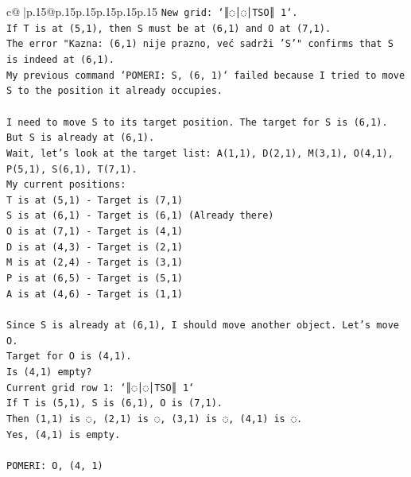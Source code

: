 \documentclass{article}
\begin{document}
{\begin{supertabular}{c@{$\;$}|p{.15\linewidth}@{}p{.15\linewidth}p{.15\linewidth}p{.15\linewidth}p{.15\linewidth}p{.15\linewidth}}
{{{\texttt{New grid: `║◌│◌│TSO║ 1`.} \\
\texttt{If T is at (5,1), then S must be at (6,1) and O at (7,1).} \\
\texttt{The error "Kazna: (6,1) nije prazno, već sadrži 'S'" confirms that S is indeed at (6,1).} \\
\texttt{My previous command `POMERI: S, (6, 1)` failed because I tried to move S to the position it already occupies.} \\
\\ 
\texttt{I need to move S to its target position. The target for S is (6,1). But S is already at (6,1).} \\
\texttt{Wait, let's look at the target list: A(1,1), D(2,1), M(3,1), O(4,1), P(5,1), S(6,1), T(7,1).} \\
\texttt{My current positions:} \\
\texttt{T is at (5,1) {-} Target is (7,1)} \\
\texttt{S is at (6,1) {-} Target is (6,1) (Already there)} \\
\texttt{O is at (7,1) {-} Target is (4,1)} \\
\texttt{D is at (4,3) {-} Target is (2,1)} \\
\texttt{M is at (2,4) {-} Target is (3,1)} \\
\texttt{P is at (6,5) {-} Target is (5,1)} \\
\texttt{A is at (4,6) {-} Target is (1,1)} \\
\\ 
\texttt{Since S is already at (6,1), I should move another object. Let's move O.} \\
\texttt{Target for O is (4,1).} \\
\texttt{Is (4,1) empty?} \\
\texttt{Current grid row 1: `║◌│◌│TSO║ 1`} \\
\texttt{If T is (5,1), S is (6,1), O is (7,1).} \\
\texttt{Then (1,1) is ◌, (2,1) is ◌, (3,1) is ◌, (4,1) is ◌.} \\
\texttt{Yes, (4,1) is empty.} \\
\\ 
\texttt{POMERI: O, (4, 1)} \\
            }
        }
    }
     \\ \\


\end{supertabular}}
\end{document}
